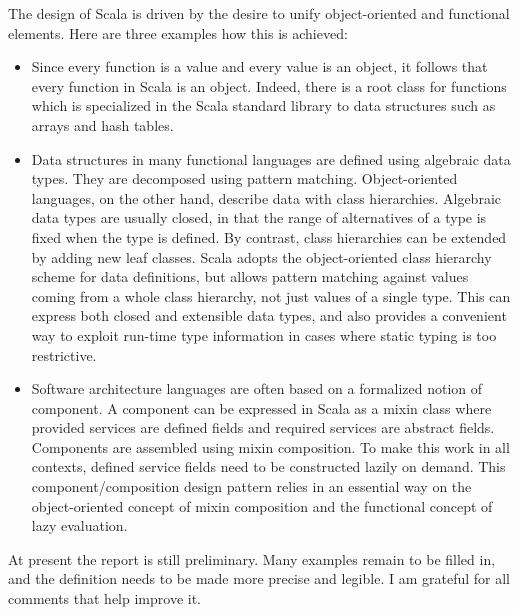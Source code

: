 The design of Scala is driven by the desire to unify object-oriented
and functional elements. Here are three examples how this is achieved:
\begin{itemize}
\item
Since every function is a value and every value is an object, it
follows that every function in Scala is an object. Indeed, there is a
root class for functions which is specialized in the Scala standard
library to data structures such as arrays and hash tables.
\item
Data structures in many functional languages are defined using
algebraic data types. They are decomposed using pattern matching.
Object-oriented languages, on the other hand, describe data with class
hierarchies. Algebraic data types are usually closed, in that the
range of alternatives of a type is fixed when the type is defined.  By
contrast, class hierarchies can be extended by adding new leaf
classes.  Scala adopts the object-oriented class hierarchy scheme for
data definitions, but allows pattern matching against values coming
from a whole class hierarchy, not just values of a single type.
This can express both closed and extensible data types, and also
provides a convenient way to exploit run-time type information in
cases where static typing is too restrictive.
\item
Software architecture languages are often based on a formalized notion
of component.  A component can be expressed in Scala as a mixin class
where provided services are defined fields and required services are
abstract fields. Components are assembled using mixin composition. To
make this work in all contexts, defined service fields need to be
constructed lazily on demand. This component/composition design
pattern relies in an essential way on the object-oriented concept of
mixin composition and the functional concept of lazy evaluation.
\end{itemize}


At present the report is still preliminary. Many examples remain to be filled
in, and the definition needs to be made more precise and legible. I am grateful
for all comments that help improve it.
